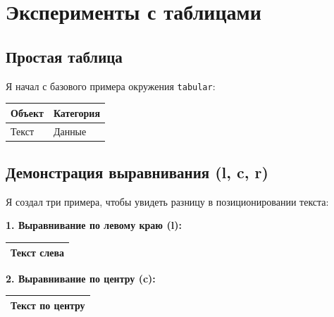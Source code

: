 \documentclass[a4paper, 12pt]{article}
\begin{document}
	
	\section{Эксперименты с таблицами}
	
	\subsection{Простая таблица}
	Я начал с базового примера окружения \texttt{tabular}:
	\begin{center}
		\begin{tabular}{ll}
			Объект & Категория \\
			\hline
			Текст & Данные \\
		\end{tabular}
	\end{center}
	
	\subsection{Демонстрация выравнивания (l, c, r)}
	Я создал три примера, чтобы увидеть разницу в позиционировании текста:
	
	\textbf{1. Выравнивание по левому краю (l):} \\
	\begin{tabular}{|l@{\hspace{3cm}}|}
		\hline
		Текст слева \\
		\hline
	\end{tabular}
	
	\vspace{0.5cm}
	
	\textbf{2. Выравнивание по центру (c):} \\
	\begin{tabular}{|@{\hspace{1.5cm}}c@{\hspace{1.5cm}}|}
		\hline
		Текст по центру \\
		\hline
	\end{tabular}
	
\end{document}
